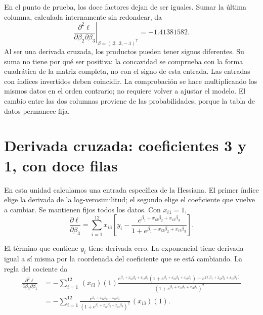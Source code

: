 \documentclass[11pt,a4paper]{article}
\newcommand{\T}{^{\mathsf T}}
\begin{document}
En el punto de prueba, los doce factores dejan de ser iguales.
Sumar la última columna, calculada internamente sin redondear, da
\[
\left.\frac{\partial^2\ell}{\partial\beta_2\partial\beta_3}\right|_{\beta=(.2,.3,-.1)\T}=-1.41381582.
\]
Al ser una derivada cruzada, los productos pueden tener signos diferentes. Su suma no tiene por qué ser positiva: la concavidad se comprueba con la forma cuadrática de la matriz completa, no con el signo de esta entrada.
Las entradas con índices invertidos deben coincidir.
La comprobación se hace multiplicando los mismos datos en el orden
contrario; no requiere volver a ajustar el modelo.
El cambio entre las dos columnas proviene de las probabilidades,
porque la tabla de datos permanece fija.

\clearpage
\section{Derivada cruzada: coeficientes 3 y 1, con doce filas}\label{logit25}
En esta unidad calculamos una entrada específica de la Hessiana.
El primer índice elige la derivada de la log-verosimilitud; el segundo
elige el coeficiente que vuelve a cambiar.
Se mantienen fijos todos los datos. Con $x_{i1}=1$,
\[
\frac{\partial\ell}{\partial\beta_3}=\sum_{i=1}^{12}x_{i3}\left[y_i-\frac{e^{\beta_1+x_{i2}\beta_2+x_{i3}\beta_3}}{1+e^{\beta_1+x_{i2}\beta_2+x_{i3}\beta_3}}\right].
\]

El término que contiene $y_i$ tiene derivada cero.
La exponencial tiene derivada igual a sí misma por la coordenada
del coeficiente que se está cambiando. La regla del cociente da
\[
\begin{aligned}
\frac{\partial^2\ell}{\partial\beta_3\partial\beta_1}&=-\sum_{i=1}^{12}\,(x_{i3})(1)\frac{e^{\beta_1+x_{i2}\beta_2+x_{i3}\beta_3}(1+e^{\beta_1+x_{i2}\beta_2+x_{i3}\beta_3})-e^{2(\beta_1+x_{i2}\beta_2+x_{i3}\beta_3)}}{(1+e^{\beta_1+x_{i2}\beta_2+x_{i3}\beta_3})^2}\\&=-\sum_{i=1}^{12}\frac{e^{\beta_1+x_{i2}\beta_2+x_{i3}\beta_3}}{(1+e^{\beta_1+x_{i2}\beta_2+x_{i3}\beta_3})^2}\,(x_{i3})(1).\end{aligned}
\]
\end{document}
